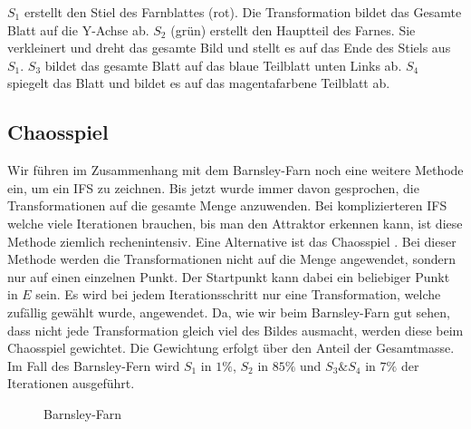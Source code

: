 $S_1$ erstellt den Stiel des Farnblattes (rot).
Die Transformation bildet das Gesamte Blatt auf die Y-Achse ab.
$S_2$ (grün) erstellt den Hauptteil des Farnes. 
Sie verkleinert und dreht das gesamte Bild und stellt es auf das Ende des Stiels aus $S_1$.
$S_3$ bildet das gesamte Blatt auf das blaue Teilblatt unten Links ab.
$S_4$ spiegelt das Blatt und bildet es auf das magentafarbene Teilblatt ab.  
\subsection{Chaosspiel}
Wir führen im Zusammenhang mit dem Barnsley-Farn \cite{ifs:barnsleyfern} noch eine weitere Methode ein, um ein IFS zu zeichnen.
Bis jetzt wurde immer davon gesprochen, die Transformationen auf die gesamte Menge anzuwenden.
Bei komplizierteren IFS welche viele Iterationen brauchen, bis man den Attraktor erkennen kann, ist diese Methode ziemlich rechenintensiv.
Eine Alternative ist das Chaosspiel \cite{ifs:chaos}. 
Bei dieser Methode werden die Transformationen nicht auf die Menge angewendet, sondern nur auf einen einzelnen Punkt.
Der Startpunkt kann dabei ein beliebiger Punkt in $E$ sein.
Es wird bei jedem Iterationsschritt nur eine Transformation, welche zufällig gewählt wurde, angewendet.
Da, wie wir beim Barnsley-Farn gut sehen, dass nicht jede Transformation gleich viel des Bildes ausmacht, werden diese beim Chaosspiel gewichtet.
Die Gewichtung erfolgt über den Anteil der Gesamtmasse.
Im Fall des Barnsley-Fern wird $S_1$ in $1\%$, $S_2$ in $85\%$ und $S_3 \& S_4$ in $7\%$ der Iterationen ausgeführt. 
\begin{figure}	
	\centering
	\caption{Barnsley-Farn}
	\label{ifs:farn}
\end{figure}
